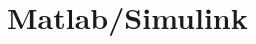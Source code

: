 \documentclass[\rootfolder/main.tex]{subfiles}
\begin{document}
\chapter{Matlab/Simulink} %

\label{Chapter03} %



\end{document}
